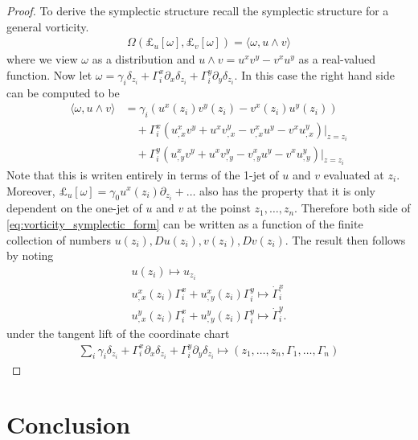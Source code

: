 \documentclass[12pt]{amsart}
\begin{document}
\begin{proof}
  To derive the symplectic structure recall the symplectic structure for a general vorticity.
  \begin{align}
    \Omega( \pounds_u[\omega] , \pounds_v[\omega] )
    = \langle \omega , u \wedge v \rangle \label{eq:vorticity_symplectic_form}
  \end{align}
  where we view $\omega$ as a distribution and $u \wedge v = u^x v^y - v^x u^y$
  as a real-valued function.
  Now let $\omega = \gamma_i \delta_{z_i} + \Gamma_i^x \partial_x\delta_{z_i} + \Gamma_i^y \partial_y \delta_{z_i}$.
  In this case the right hand side can be computed to be
  \begin{align*}
    \langle \omega , u \wedge v \rangle &= \gamma_i ( u^x(z_i)v^y(z_i) - v^x(z_i) u^y(z_i) ) \\
    &\quad + \Gamma_i^x ( u^x_{,x} v^y + u^x v^y_{,x} - v^x_{,x}u^y - v^x u^y_{,x})|_{z = z_i} \\
    &\quad + \Gamma_i^y ( u^x_{,y} v^y + u^x v^y_{,y} - v^x_{,y}u^y - v^x u^y_{,y})|_{z = z_i}
  \end{align*}
  Note that this is writen entirely in terms of the 1-jet of $u$ and $v$ evaluated 
  at $z_i$.
  Moreover, $\pounds_u[\omega] = \gamma_0 u^x(z_i) \partial_{z_i} + \dots$
  also has the property that it is only dependent on
  the one-jet of $u$ and $v$ at the poinst $z_1,\dots,z_n$.
  Therefore both side of \eqref{eq:vorticity_symplectic_form}
  can be written as a function of the finite collection of 
  numbers $u(z_i), Du(z_i), v(z_i),Dv(z_i)$.
  The result then follows by noting
  \begin{align*}
    u(z_i) \mapsto u_{z_i}\\
    u^x_{,x}(z_i) \Gamma^x_i + u^x_{,y}(z_i) \Gamma^y_i \mapsto \dot{\Gamma}_i^x \\
    u^y_{,x}(z_i) \Gamma^x_i + u^y_{,y}(z_i) \Gamma^y_i \mapsto \dot{\Gamma}_i^y.
    \end{align*}
    under the tangent lift of the coordinate chart
    \begin{align*}
      \sum_i \gamma_i \delta_{z_i} + \Gamma_i^x \partial_x \delta_{z_i} + \Gamma_i^y \partial_y \delta_{z_i} \mapsto (z_1,\dots,z_n,\Gamma_1,\dots,\Gamma_n)
      \end{align*}
\end{proof}


\section{Conclusion}
\end{document}
